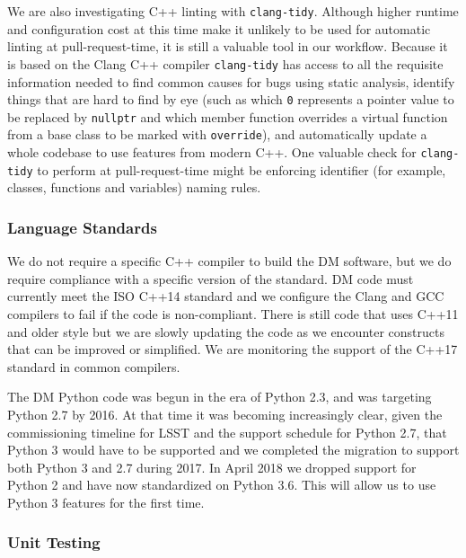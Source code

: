 We are also investigating C++ linting with \texttt{clang-tidy}\cite{clangtidy}. Although higher runtime and configuration cost at this time make it unlikely to be used for automatic linting at pull-request-time, it is still a valuable tool in our workflow.
Because it is based on the Clang C++ compiler \texttt{clang-tidy} has access to all the requisite information needed to find common causes for bugs using static analysis, identify things that are hard to find by eye (such as which \texttt{0} represents a pointer value to be replaced by \texttt{nullptr} and which member function overrides a virtual function from a base class to be marked with \texttt{override}), and automatically update a whole codebase to use features from modern C++.
One valuable check for \texttt{clang-tidy} to perform at pull-request-time might be enforcing identifier (for example, classes, functions and variables) naming rules.

\subsubsection{Language Standards}

We do not require a specific C++ compiler to build the DM software, but we do require compliance with a specific version of the standard.
DM code must currently meet the ISO C++14 standard\cite{cpp14} and we configure the Clang and GCC compilers to fail if the code is non-compliant.
There is still code that uses C++11 and older style but we are slowly updating the code as we encounter constructs that can be improved or simplified.
We are monitoring the support of the C++17 standard in common compilers.

The DM Python code was begun in the era of Python 2.3, and was targeting Python 2.7 by 2016.
At that time it was becoming increasingly clear, given the commissioning timeline for LSST and the support schedule for Python 2.7, that Python 3 would have to be supported and we completed the migration to support both Python 3 and 2.7 during 2017\cite{2016arXiv161100751J}.
In April 2018 we dropped support for Python 2 and have now standardized on Python 3.6\cite{2017arXiv171200461J}.
This will allow us to use Python 3 features for the first time.

\subsubsection{Unit Testing}


